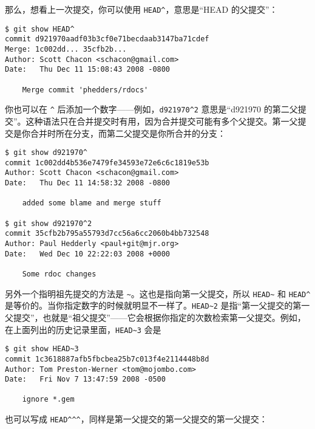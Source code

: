 \documentclass[a4paper]{book}
\begin{document}
那么，想看上一次提交，你可以使用 \texttt{HEAD\^{}}，意思是“HEAD 的父提交”：

\begin{shaded}\begin{verbatim}
$ git show HEAD^
commit d921970aadf03b3cf0e71becdaab3147ba71cdef
Merge: 1c002dd... 35cfb2b...
Author: Scott Chacon <schacon@gmail.com>
Date:   Thu Dec 11 15:08:43 2008 -0800

    Merge commit 'phedders/rdocs'
\end{verbatim}\end{shaded}

你也可以在 \texttt{\^{}} 后添加一个数字------例如，\texttt{d921970\^{}2} 意思是“d921970 的第二父提交”。这种语法只在合并提交时有用，因为合并提交可能有多个父提交。第一父提交是你合并时所在分支，而第二父提交是你所合并的分支：

\begin{shaded}\begin{verbatim}
$ git show d921970^
commit 1c002dd4b536e7479fe34593e72e6c6c1819e53b
Author: Scott Chacon <schacon@gmail.com>
Date:   Thu Dec 11 14:58:32 2008 -0800

    added some blame and merge stuff

$ git show d921970^2
commit 35cfb2b795a55793d7cc56a6cc2060b4bb732548
Author: Paul Hedderly <paul+git@mjr.org>
Date:   Wed Dec 10 22:22:03 2008 +0000

    Some rdoc changes
\end{verbatim}\end{shaded}

另外一个指明祖先提交的方法是 \texttt{\textasciitilde{}}。这也是指向第一父提交，所以 \texttt{HEAD\textasciitilde{}} 和 \texttt{HEAD\^{}} 是等价的。当你指定数字的时候就明显不一样了。\texttt{HEAD\textasciitilde{}2} 是指“第一父提交的第一父提交”，也就是“祖父提交”------它会根据你指定的次数检索第一父提交。例如，在上面列出的历史记录里面，\texttt{HEAD\textasciitilde{}3} 会是

\begin{shaded}\begin{verbatim}
$ git show HEAD~3
commit 1c3618887afb5fbcbea25b7c013f4e2114448b8d
Author: Tom Preston-Werner <tom@mojombo.com>
Date:   Fri Nov 7 13:47:59 2008 -0500

    ignore *.gem
\end{verbatim}\end{shaded}

也可以写成 \texttt{HEAD\^{}\^{}\^{}}，同样是第一父提交的第一父提交的第一父提交：
\end{document}
